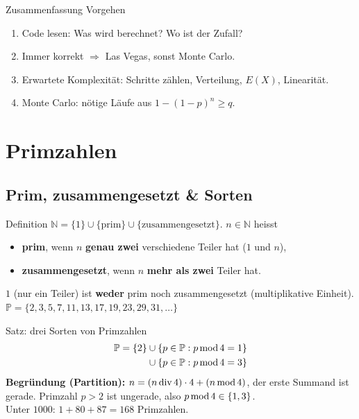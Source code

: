 \documentclass[a4paper, fontsize=7pt]{scrartcl}
\newcommand{\Div}{\mskip3mu\mathrm{div}\mskip3mu}
\newcommand{\Mod}{\mskip3mu\mathrm{mod}\mskip3mu}
\begin{document}
\begin{subbox}{Zusammenfassung Vorgehen}
\begin{enumerate}
    \item Code lesen: Was wird berechnet? Wo ist der Zufall?
    \item Immer korrekt $\Rightarrow$ Las Vegas, sonst Monte Carlo.
    \item Erwartete Komplexität: Schritte zählen, Verteilung, $E(X)$, Linearität.
    \item Monte Carlo: nötige Läufe aus $1 - (1 - p)^n \ge q$.
\end{enumerate}
\end{subbox}

\section{Primzahlen}

\subsection{Prim, zusammengesetzt \& Sorten}

\begin{mainbox}{Definition}
$\mathbb{N} = \{1\} \cup \{\text{prim}\} \cup \{\text{zusammengesetzt}\}$.
$n \in \mathbb{N}$ heisst
\begin{itemize}
    \item \textbf{prim}, wenn $n$ \textbf{genau zwei} verschiedene Teiler hat
          ($1$ und $n$),
    \item \textbf{zusammengesetzt}, wenn $n$ \textbf{mehr als zwei} Teiler hat.
\end{itemize}
$1$ (nur ein Teiler) ist \textbf{weder} prim noch zusammengesetzt
(multiplikative Einheit).\\
$\mathbb{P} = \{2, 3, 5, 7, 11, 13, 17, 19, 23, 29, 31, \ldots\}$
\end{mainbox}

\begin{mainbox}{Satz: drei Sorten von Primzahlen}
\begin{align*}
\mathbb{P} = \{2\} &\cup \{p \in \mathbb{P} : p \Mod 4 = 1\}\\
&\cup \{p \in \mathbb{P} : p \Mod 4 = 3\}
\end{align*}
\textbf{Begründung (Partition):} $n = (n \Div 4) \cdot 4 + (n \Mod 4)$,
der erste Summand ist gerade. Primzahl $p > 2$ ist ungerade, also
$p \Mod 4 \in \{1, 3\}$.\\
Unter $1000$: $1 + 80 + 87 = 168$ Primzahlen.
\end{mainbox}
\end{document}
